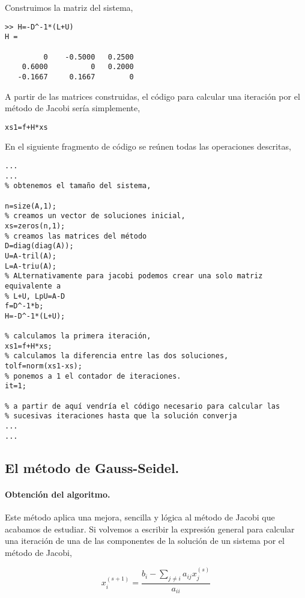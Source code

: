 Construimos la matriz del sistema,

\begin{verbatim}
>> H=-D^-1*(L+U)
H =

         0    -0.5000   0.2500
    0.6000          0   0.2000
   -0.1667     0.1667        0
\end{verbatim}


A partir de las matrices construidas, el código para calcular una iteración por el método de Jacobi sería simplemente,

\begin{verbatim}
xs1=f+H*xs
\end{verbatim}


En el siguiente fragmento de código se reúnen todas las operaciones descritas,

\begin{lstlisting}
...
...
% obtenemos el tamaño del sistema,

n=size(A,1);
% creamos un vector de soluciones inicial,
xs=zeros(n,1);
% creamos las matrices del método
D=diag(diag(A));
U=A-tril(A);
L=A-triu(A);
% ALternativamente para jacobi podemos crear una solo matriz equivalente a
% L+U, LpU=A-D
f=D^-1*b;
H=-D^-1*(L+U);

% calculamos la primera iteración,
xs1=f+H*xs;
% calculamos la diferencia entre las dos soluciones,
tolf=norm(xs1-xs);
% ponemos a 1 el contador de iteraciones.
it=1;

% a partir de aquí vendría el código necesario para calcular las
% sucesivas iteraciones hasta que la solución converja
...
...
\end{lstlisting}

\subsection{El método de Gauss-Seidel.} 
\paragraph{Obtención del algoritmo.} Este método aplica una mejora, sencilla y lógica al método de Jacobi que acabamos de estudiar. Si volvemos a escribir la expresión general para calcular una iteración de una de las componentes de la solución de un sistema por el método de Jacobi,

\begin{equation*}
x_i^{(s+1)}=\frac{b_i-\sum_{j\neq i}a_{ij}x_j^{(s)}}{a_{ii}}
\end{equation*}

